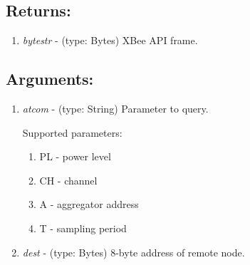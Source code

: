 \subsection{Returns:}
\begin{enumerate}
\item \emph{bytestr} - (type: Bytes) XBee API frame.
\end{enumerate}
\subsection{Arguments:}
\begin{enumerate}
\item \emph{atcom} - (type: String) Parameter to query.

\begin{minipage}{0.5\textwidth}
Supported parameters:
\begin{enumerate}
\item PL - power level
\item CH - channel
\item A - aggregator address
\item T - sampling period
\end{enumerate}
\end{minipage}
\item \emph{dest} - (type: Bytes) 8-byte address of remote node.
\end{enumerate}